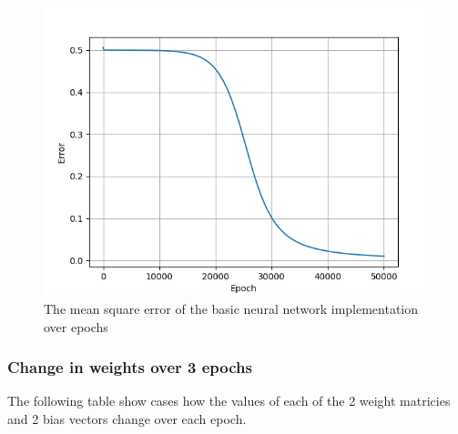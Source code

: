 \documentclass{article}
\begin{document}
\begin{figure}[!htb]
\centering
	\includegraphics[width=\textwidth]{basic-error.png}
\caption{The mean square error of the basic neural network implementation over epochs}
\end{figure}
\clearpage

\subsubsection{Change in weights over 3 epochs}
The following table show cases how the values of each of the 2 weight matricies and 2 bias vectors change over each epoch.
\end{document}
